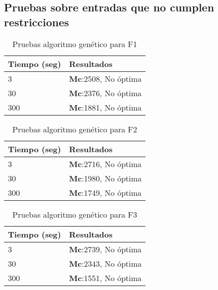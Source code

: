 \subsection{Pruebas sobre entradas que no cumplen restricciones}

\begin{center}
\begin{longtable}{|p{4cm}|p{13cm}|}
	\caption{Pruebas algoritmo genético para F1}\\
	\hline
	\cellcolor[gray]{0.9} \textbf{Tiempo (seg)} & \cellcolor[gray]{0.9}\textbf{Resultados} \\
	\hline
	3 & \textbf{Mc}:2508, No óptima\\
	\hline
	30 & \textbf{Mc}:2376, No óptima\\
	\hline
	300 & \textbf{Mc}:1881, No óptima\\
	\hline
\end{longtable}	
\end{center}

\begin{center}
\begin{longtable}{|p{4cm}|p{13cm}|}
	\caption{Pruebas algoritmo genético para F2}\\
	\hline
	\cellcolor[gray]{0.9} \textbf{Tiempo (seg)} & \cellcolor[gray]{0.9}\textbf{Resultados} \\
	\hline
	3 & \textbf{Mc}:2716, No óptima\\
	\hline
	30 & \textbf{Mc}:1980, No óptima\\
	\hline
	300 & \textbf{Mc}:1749, No óptima\\
	\hline
\end{longtable}	
\end{center}


\begin{center}
\begin{longtable}{|p{4cm}|p{13cm}|}
	\caption{Pruebas algoritmo genético para F3}\\
	\hline
	\cellcolor[gray]{0.9} \textbf{Tiempo (seg)} & \cellcolor[gray]{0.9}\textbf{Resultados} \\
	\hline
	3 & \textbf{Mc}:2739, No óptima\\
	\hline
	30 & \textbf{Mc}:2343, No óptima\\
	\hline
	300 & \textbf{Mc}:1551, No óptima\\
	\hline
\end{longtable}	
\end{center}
